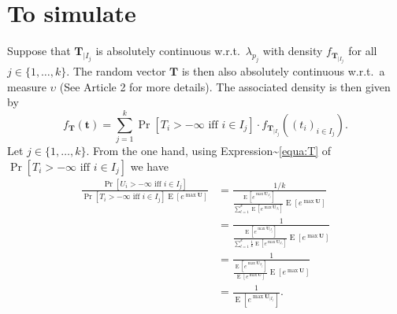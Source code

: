 \documentclass[
]{article}
\begin{document}
\section{To simulate}

Suppose that \(\boldsymbol{T}_{\mid I_j}\) is absolutely continuous
w.r.t.~\(\lambda_{p_j}\) with density \(f_{\boldsymbol{T}_{\mid I_j}}\)
for all \(j \in \{1,\ldots,k\}\). The random vector \(\boldsymbol{T}\)
is then also absolutely continuous w.r.t.~a measure \(\upsilon\) (See
Article 2 for more details). The associated density is then given by \[
f_{\boldsymbol{T}}(\boldsymbol{t})= \sum_{j=1}^{k} \Pr[T_i>-\infty \text{ iff } i \in I_j] \cdot f_{\boldsymbol{T} _{\mid I_j}}((t_i)_{i \in I_j}).
\] Let \(j \in \{1,\ldots,k\}\). From the one hand, using
Expression\textasciitilde{}\eqref{equa:T} of
\(\Pr[T_i>-\infty \text{ iff } i\in I_j]\) we have \[
\begin{aligned}
\frac{\Pr[U_i>-\infty \text{ iff } i \in I_j]}{ \Pr[T_i>-\infty \text { iff } i \in I_j] \operatorname{E}[e^{\max \boldsymbol{U}}] }
&=\frac{1/k}{ \tfrac{\operatorname{E}[e^{\max \boldsymbol{U}_{\mid I_{j}}}]}{\sum_{l=1}^k \operatorname{E}[e^{\max \boldsymbol{U}_{\mid I_{l}}}] } \operatorname{E}[e^{\max \boldsymbol{U}}]  }\\
&=\frac{1}{ \tfrac{\operatorname{E}[e^{\max \boldsymbol{U}_{\mid I_{j}}}]}{\sum_{l=1}^k \tfrac{1}{k} \operatorname{E}[e^{\max \boldsymbol{U}_{\mid I_{l}}}] } \operatorname{E}[e^{\max \boldsymbol{U}}]  }\\
&=\frac{1}{ \tfrac{\operatorname{E}[e^{\max \boldsymbol{U}_{\mid I_{j}}}]}{\operatorname{E}[e^{\max \boldsymbol{U}}]} \operatorname{E}[e^{\max \boldsymbol{U}}]  }\\
&=\frac{1}{\operatorname{E}[e^{\max \boldsymbol{U}_{\mid I_{j}}}]}.
\end{aligned}
\]
\end{document}

